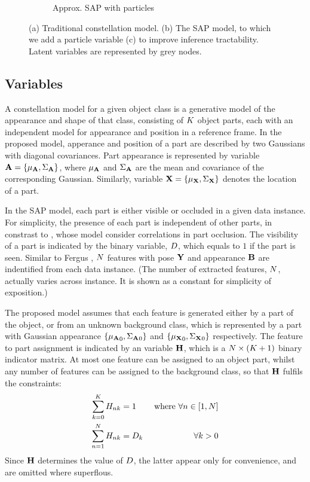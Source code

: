 \begin{figure}[ht]
\begin{subfigure}[t]{0.48\linewidth}
	\caption{Approx. SAP with particles}
	\label{fig/reg/graphicalModelParticle}
\end{subfigure}
\caption{(a) Traditional constellation model. (b) The SAP model, to which we add a particle variable (c) to improve inference tractability. Latent variables are represented by grey nodes.}
\label{fig/reg/graphicalmodel}
\end{figure} 

\subsection{Variables}

A constellation model for a given object class is a generative model of the appearance and shape of that class, consisting of $K$ object parts, each with an independent model for appearance and position in a reference frame. In the proposed model, apperance and position of a part are described by two Gaussians with diagonal covariances. Part appearance is represented by variable $\mathbf{A}=\{{\mu_{\mathbf{A}}},{\Sigma_{\mathbf{A}}}\}$, where ${\mu_{\mathbf{A}}}$ and ${\Sigma_{\mathbf{A}}}$ are the mean and covariance of the corresponding Gaussian. Similarly, variable $\mathbf{X}=\{{\mu_{\mathbf{X}}},{\Sigma_{\mathbf{X}}}\}$ denotes the location of a part. 

In the SAP model, each part is either visible or occluded in a given data instance.   
For simplicity, the presence of each part is independent of other parts, in constrast to \cite{Fergus2007, Weber2000}, whose model consider correlations in part occlusion. 
The visibility of a part is indicated by the binary variable, ${D}$, which equals to $1$ if the part is seen. Similar to Fergus \etal \cite{Fergus2007}, $N$ features with pose $\mathbf{Y}$ and appearance $\mathbf{B}$ are indentified from each data instance. (The number of extracted features, $N$, actually varies across instance. It is shown as a constant for simplicity of exposition.)  

The proposed model assumes that each feature is generated either by a part of the object, or from an unknown background class, which is represented by a part with Gaussian appearance $\{{\mu_{\mathbf{A}}}_0, {\Sigma_{\mathbf{A}}}_0\}$ and $\{{\mu_{\mathbf{X}}}_0, {\Sigma_{\mathbf{X}}}_0\}$ respectively. 
The feature to part assignment is indicated by an variable $\mathbf{H}$, which is a $N \times (K + 1)$ binary indicator matrix. 
At most one feature can be assigned to an object part, whilst any number of features can be assigned to the background class, so that $\mathbf{H}$ fulfils the constraints: 
\begin{equation}
	\begin{aligned}
		\sum_{k = 0}^{K}{H}_{nk}& =1 & \mbox{ where } \forall n \in [1, N] \\ 
		\sum_{n = 1}^{N}{H}_{nk}& ={D}_k & \forall k>0
	\end{aligned} 
\end{equation}
Since $\mathbf{H}$ determines the value of ${D}$, the latter appear only for convenience, and are omitted where superflous. 

